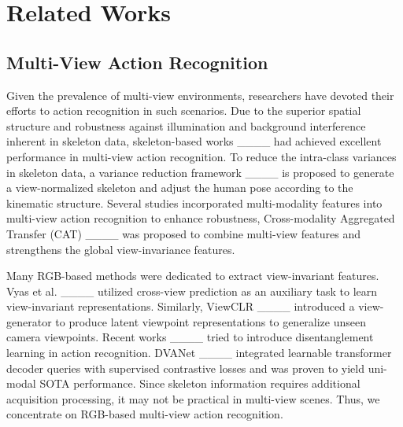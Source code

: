 \section{Related Works}
\subsection{Multi-View Action Recognition}

Given the prevalence of multi-view environments, researchers have devoted their efforts to action recognition in such scenarios.
Due to the superior spatial structure and robustness against illumination and background interference inherent in skeleton data, skeleton-based works ____ had achieved excellent performance in multi-view action recognition.
To reduce the intra-class variances in skeleton data, a variance reduction framework ____ is proposed to generate a view-normalized skeleton and adjust the human pose according to the kinematic structure.
Several studies incorporated multi-modality features into multi-view action recognition to enhance robustness, Cross-modality Aggregated Transfer (CAT) ____ was proposed to combine multi-view features and strengthens the global view-invariance features. 

Many RGB-based methods were dedicated to extract view-invariant features.
Vyas et al. ____ utilized cross-view prediction as an auxiliary task to learn view-invariant representations. 
Similarly, ViewCLR ____ introduced a view-generator to produce latent viewpoint representations to generalize unseen camera viewpoints. 
Recent works ____ tried to introduce disentanglement learning in action recognition.
DVANet ____ integrated learnable transformer decoder queries with supervised contrastive losses and was proven to yield uni-modal SOTA performance.
Since skeleton information requires additional acquisition processing, it may not be practical in multi-view scenes. Thus, we concentrate on RGB-based multi-view action recognition.

